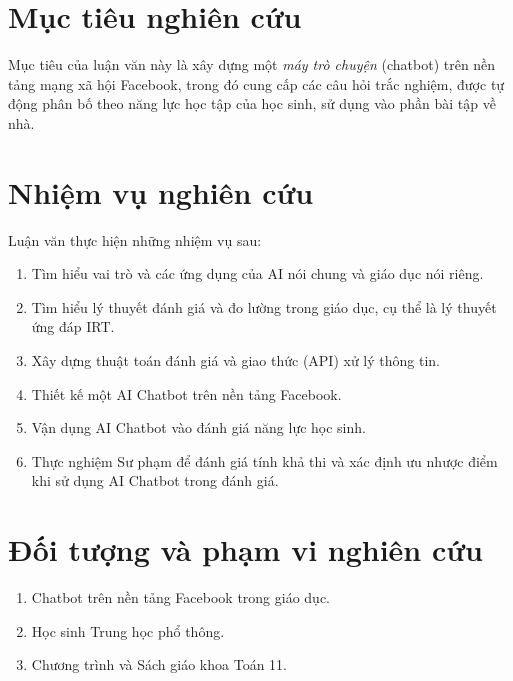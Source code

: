 \section{Mục tiêu nghiên cứu}
Mục tiêu của luận văn này là xây dựng một \textit{máy trò chuyện} (chatbot) trên nền tảng mạng xã hội Facebook, trong đó cung cấp các câu hỏi trắc nghiệm, được tự động phân bố theo năng lực học tập của học sinh, sử dụng vào phần bài tập về nhà.
\newpage
\section{Nhiệm vụ nghiên cứu}
Luận văn thực hiện những nhiệm vụ sau:\par
\begin{enumerate}[label=\textbf{(\arabic*)},align=left,left=1cm..0cm,itemindent=*]
	\item Tìm hiểu vai trò và các ứng dụng của AI nói chung và giáo dục nói riêng.
	\item Tìm hiểu lý thuyết đánh giá và đo lường trong giáo dục, cụ thể là lý thuyết ứng đáp IRT.
	\item Xây dựng thuật toán đánh giá và giao thức (API) xử lý thông tin.
	\item Thiết kế một AI Chatbot trên nền tảng Facebook.
	\item Vận dụng AI Chatbot vào đánh giá năng lực học sinh.
	\item Thực nghiệm Sư phạm để đánh giá tính khả thi và xác định ưu nhược điểm khi sử dụng AI Chatbot trong đánh giá.
\end{enumerate}\par

\section{Đối tượng và phạm vi nghiên cứu}
\begin{enumerate}[label=\textbf{(\arabic*)},align=left,left=1cm..0cm,itemindent=*]
	\item Chatbot trên nền tảng Facebook trong giáo dục.
	\item Học sinh Trung học phổ thông.
	\item Chương trình và Sách giáo khoa Toán 11.
\end{enumerate}

